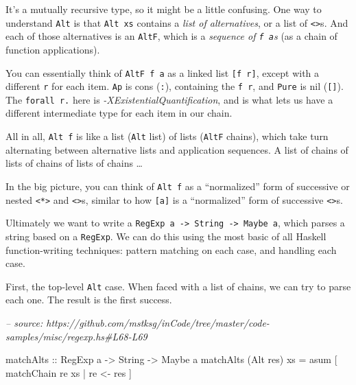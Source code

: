 \documentclass[]{article}
\newenvironment{Shaded}{}{}
\newcommand{\CommentTok}[1]{\textcolor[rgb]{0.38,0.63,0.69}{\textit{#1}}}
\newcommand{\DataTypeTok}[1]{\textcolor[rgb]{0.56,0.13,0.00}{#1}}
\newcommand{\FunctionTok}[1]{\textcolor[rgb]{0.02,0.16,0.49}{#1}}
\newcommand{\NormalTok}[1]{#1}
\newcommand{\OtherTok}[1]{\textcolor[rgb]{0.00,0.44,0.13}{#1}}
\begin{document}
It's a mutually recursive type, so it might be a little confusing. One way to
understand \texttt{Alt} is that \texttt{Alt\ xs} contains a \emph{list of
alternatives}, or a list of \texttt{\textless{}\textbar{}\textgreater{}}s. And
each of those alternatives is an \texttt{AltF}, which is a \emph{sequence of
\texttt{f\ a}s} (as a chain of function applications).

You can essentially think of \texttt{AltF\ f\ a} as a linked list
\texttt{{[}f\ r{]}}, except with a different \texttt{r} for each item.
\texttt{Ap} is cons (\texttt{:}), containing the \texttt{f\ r}, and
\texttt{Pure} is nil (\texttt{{[}{]}}). The \texttt{forall\ r.} here is
\emph{-XExistentialQuantification}, and is what lets us have a different
intermediate type for each item in our chain.

All in all, \texttt{Alt\ f} is like a list (\texttt{Alt} list) of lists
(\texttt{AltF} chains), which take turn alternating between alternative lists
and application sequences. A list of chains of lists of chains of lists of
chains \ldots{}

In the big picture, you can think of \texttt{Alt\ f} as a ``normalized'' form of
successive or nested \texttt{\textless{}*\textgreater{}} and
\texttt{\textless{}\textbar{}\textgreater{}}s, similar to how \texttt{{[}a{]}}
is a ``normalized'' form of successive \texttt{\textless{}\textgreater{}}s.

Ultimately we want to write a
\texttt{RegExp\ a\ -\textgreater{}\ String\ -\textgreater{}\ Maybe\ a}, which
parses a string based on a \texttt{RegExp}. We can do this using the most basic
of all Haskell function-writing techniques: pattern matching on each case, and
handling each case.

First, the top-level \texttt{Alt} case. When faced with a list of chains, we can
try to parse each one. The result is the first success.

\begin{Shaded}
\begin{Highlighting}[]
\CommentTok{-- source: https://github.com/mstksg/inCode/tree/master/code-samples/misc/regexp.hs#L68-L69}

\OtherTok{matchAlts ::} \DataTypeTok{RegExp}\NormalTok{ a }\OtherTok{->} \DataTypeTok{String} \OtherTok{->} \DataTypeTok{Maybe}\NormalTok{ a}
\NormalTok{matchAlts (}\DataTypeTok{Alt}\NormalTok{ res) xs }\FunctionTok{=}\NormalTok{ asum [ matchChain re xs }\FunctionTok{|}\NormalTok{ re }\OtherTok{<-}\NormalTok{ res ]}
\end{Highlighting}
\end{Shaded}
\end{document}

